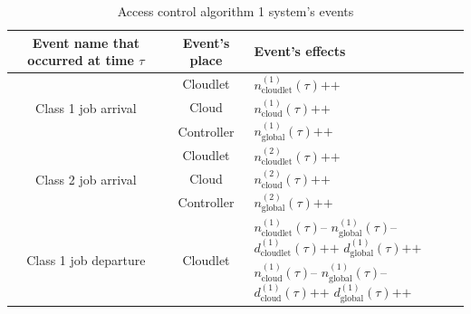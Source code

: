 \documentclass[10pt,a4paper]{article}
\begin{document}
\begin{table}[h!]
    \caption{Access control algorithm 1 system's events}
    \begin{adjustbox}{center=\textwidth}
    \label{table:SystemEvents}
     \begin{tabular}{c|c|p{2.5cm}}

      \toprule
      \textbf{Event name that occurred at time $\tau$} & \textbf{Event's place} & \textbf{Event's effects} \\
      \midrule
      
      \multirow{3}{*}{Class 1 job arrival} & Cloudlet & $n_{\text{cloudlet}}^{(1)}(\tau)\texttt{++}$ \\ \cline{2-3} 
      & Cloud & $n_{\text{cloud}}^{(1)}(\tau)\texttt{++}$ \\ \cline{2-3} 
      & Controller & $n_{\text{global}}^{(1)}(\tau)\texttt{++}$ \\ 
       
      \hline
       
      \multirow{3}{*}{Class 2 job arrival} & Cloudlet & $n_{\text{cloudlet}}^{(2)}(\tau)\texttt{++}$ \\ \cline{2-3} 
      & Cloud & $n_{\text{cloud}}^{(2)}(\tau)\texttt{++}$ \\ \cline{2-3} 
      & Controller & $n_{\text{global}}^{(2)}(\tau)\texttt{++}$ \\ 
    
	  \hline
       
      \multirow{8}{*}{Class 1 job departure} & \multirow{4}{*}{Cloudlet} & $n_{\text{cloudlet}}^{(1)}(\tau)\texttt{--}$ \newline $n_{\text{global}}^{(1)}(\tau)\texttt{--}$ \newline $d_{\text{cloudlet}}^{(1)}(\tau)\texttt{++}$ \newline $d_{\text{global}}^{(1)}(\tau)\texttt{++}$ \\ \cline{2-3} 
      & \multirow{4}{*}{Cloud} & $n_{\text{cloud}}^{(1)}(\tau)\texttt{--}$ \newline $n_{\text{global}}^{(1)}(\tau)\texttt{--}$ \newline $d_{\text{cloud}}^{(1)}(\tau)\texttt{++}$ \newline $d_{\text{global}}^{(1)}(\tau)\texttt{++}$ \\ \cline{2-3} 
 
 		\hline
       

\end{tabular}
\end{adjustbox}
\end{table}
\end{document}
